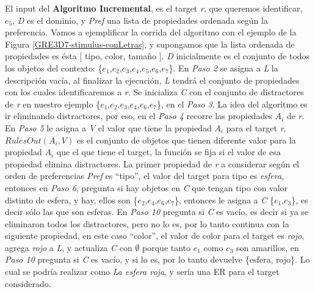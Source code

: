 El input del {\bf Algoritmo Incremental}, es el target \emph{r}, que queremos identificar, $e_{5}$, \emph{D} es el dominio, y \emph{Pref} una lista de propiedades ordenada seg\'un la preferencia. Vamos a ejemplificar la corrida del algoritmo con el ejemplo de la Figura \ref{GRE3D7-stimulus-conLetras}, y supongamos que la lista ordenada de propiedades es \'esta [ tipo, color, tama\~no ]. \emph{D} inicialmente es el conjunto de todos los objetos del contexto: \{$e_{1}$,$e_{2}$,$e_{3}$,$e_{4}$,$e_{5}$,$e_{6}$,$e_{7}$\}.
En {\it Paso 2} se asigna a \emph{L} la descripci\'on vac\'{i}a, al finalizar la ejecuci\'on, \emph{L} tendr\'a el conjunto de propiedades con los cuales identificaremos a \emph{r}. Se inicializa \emph{C} con el conjunto de distractores de \emph{r} en nuestro ejemplo \{$e_{1}$,$e_{2}$,$e_{3}$,$e_{4}$,$e_{6}$,$e_{7}$\}, en el {\it Paso 3}. 
La idea del algoritmo es ir eliminando distractores, por eso, en el {\it Paso 4} recorre las propiedades $A_{i}$ de \emph{r}. En {\it Paso 5} le asigna a \emph{V} el valor que tiene la propiedad $A_{i}$ para el target \emph{r}, $RulesOut(A_{i},V)$ es el conjunto de objetos que tienen diferente valor para la propiedad $A_{i}$ que el que tiene el  target, la funci\'on se fija si el valor de esa propiedad elimina distractores. La primer propiedad de \emph{r} a considerar seg\'un el orden de preferencias \emph{Pref} es ``tipo'', el valor del target para tipo es {\it esfera}, entonces en {\it Paso 6}, pregunta si hay objetos en \emph{C} que tengan tipo con valor distinto de esfera, y hay, ellos son \{$e_{2}$,$e_{4}$,$e_{6}$,$e_{7}$\}, entonces le asigna a \emph{C} \{$e_{1}$,$e_{3}$\}, es decir s\'olo las que son esferas. En {\it Paso 10} pregunta si \emph{C} es vac\'io, es decir si ya se eliminaron todos los distractores, pero no lo es, por lo tanto continua con la siguiente propiedad, en este caso ``color'', el valor de color para el target es {\it rojo}, agrega {\it rojo} a \emph{L}, y actualiza \emph{C} con $\emptyset$ porque tanto $e_{1}$ como $e_{3}$ son amarillos, en {\it Paso 10} pregunta si \emph{C} es vac\'io, y si lo es, por lo tanto devuelve \{esfera, rojo\}. Lo cual se podr\'ia realizar como {\it La esfera roja}, y ser\'ia una ER para el target considerado.


